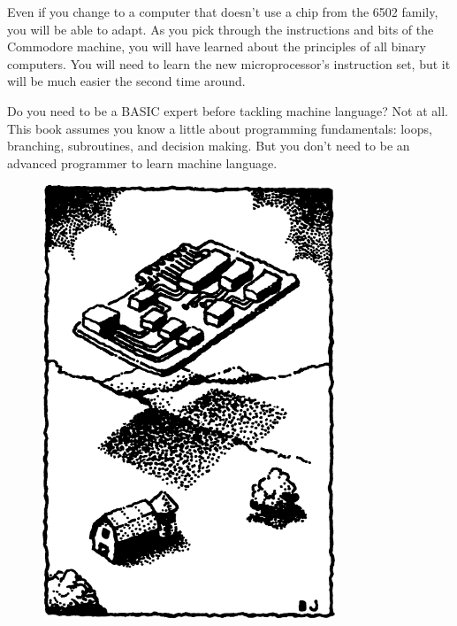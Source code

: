 \documentclass[11pt,a4paper,titlepage]{memoir}
\renewcommand{\chaptermark}[1]{ \markboth{#1}{} }
\renewcommand{\sectionmark}[1]{ \markright{#1} }
\renewcommand{\headrulewidth}{0pt} %
\begin{document}
Even if you change to a computer that doesn't use a chip from the 6502 family, you will be able to adapt. As you pick through the instructions and bits of the Commodore machine, you will have learned about the principles of all binary computers. You will need to learn the new microprocessor's instruction set, but it will be much easier the second time around.

Do you need to be a BASIC expert before tackling machine language? Not at all. This book assumes you know a little about programming fundamentals: loops, branching, subroutines, and decision making. But you don't need to be an advanced programmer to learn machine language.
\newpage
\pagestyle{plain}
\begin{figure}
	\centering
	\includegraphics[width=1\linewidth]{screenshot002}
	\label{fig:screenshot002}
\end{figure}
\mainmatter
\newpage
\pagestyle{myfancy}
\end{document}
